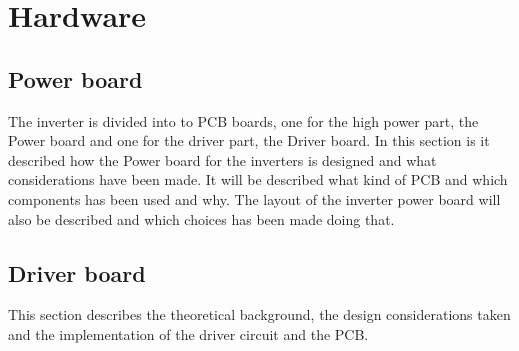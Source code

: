 \section{Hardware}



\subsection{Power board}
The inverter is divided into to PCB boards, one for the high power part, the Power board and one for the driver part, the Driver board. In this section is it described how the Power board for the inverters is designed and what considerations have been made. It will be described what kind of PCB and which components has been used and why. The layout of the inverter power board will also be described and which choices has been made doing that.

% 
% 

\subsection{Driver board}
This section describes the theoretical background, the design considerations taken and the implementation of the driver circuit and the PCB.


